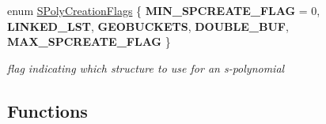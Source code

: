 \begin{DoxyCompactItemize}
\item 
enum \hyperlink{group___g_b_computation_ga73257b8a2d5cc826853a71b77d0cebf2}{S\+Poly\+Creation\+Flags} \{ \newline
{\bfseries M\+I\+N\+\_\+\+S\+P\+C\+R\+E\+A\+T\+E\+\_\+\+F\+L\+AG} = 0, 
{\bfseries L\+I\+N\+K\+E\+D\+\_\+\+L\+ST}, 
{\bfseries G\+E\+O\+B\+U\+C\+K\+E\+TS}, 
{\bfseries D\+O\+U\+B\+L\+E\+\_\+\+B\+UF}, 
\newline
{\bfseries M\+A\+X\+\_\+\+S\+P\+C\+R\+E\+A\+T\+E\+\_\+\+F\+L\+AG}
 \}\begin{DoxyCompactList}\small\item\em flag indicating which structure to use for an s-\/polynomial \end{DoxyCompactList}
\end{DoxyCompactItemize}
\subsection*{Functions}
